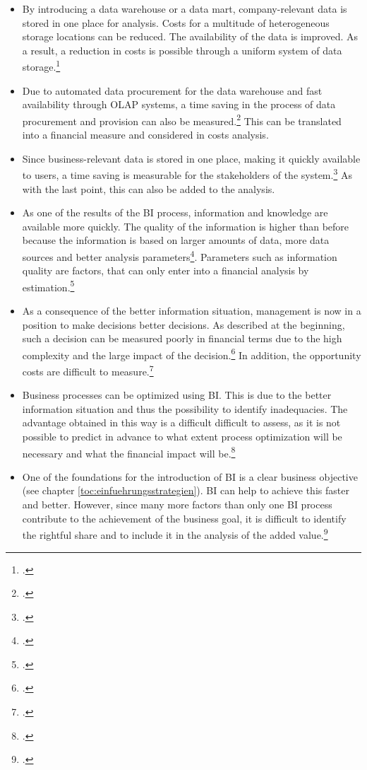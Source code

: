 \begin{itemize}
    \item By introducing a data warehouse or a data mart, company-relevant data is stored in one place for analysis.
    Costs for a multitude of heterogeneous storage locations can be reduced. The availability
    of the data is improved. As a result, a reduction in costs is possible through a uniform system of data storage.\footcite[Cf.][p. 105]{azma2012business}
    \item Due to automated data procurement for the data warehouse and fast availability through \ac{OLAP} systems,
    a time saving in the process of data procurement and provision can also be measured.\footcite[Cf.][p. 51]{horakova2013business}
    This can be translated into a financial measure and considered in costs analysis.
    \item Since business-relevant data is stored in one place, making it quickly available to users,
    a time saving is measurable for the stakeholders of the system.\footcite[Cf.][p. 97]{williams2003business} As with the
    last point, this can also be added to the analysis.
    \item As one of the results of the BI process, information and knowledge are available more quickly. The quality of the
    information is higher than before because the information is based on larger amounts of data, more data sources and better analysis
    parameters\footcite[Cf.][p. 51]{horakova2013business}. Parameters such as information quality are factors,
    that can only enter into a financial analysis by estimation.\footcite[Cf.][p. 51]{horakova2013business}
    \item As a consequence of the better information situation, management is now in a position to make decisions better
    decisions. As described at the beginning, such a decision can be measured poorly in financial terms due to the high complexity and the large impact of the decision.\footcite[Cf.][p. 51]{horakova2013business}
    In addition, the opportunity costs are difficult to measure.\footcite[Cf.][p. 99]{hovcevar2010assessing}
    \item Business processes can be optimized using \ac{BI}. This is due to the better information situation and
    thus the possibility to identify inadequacies. The advantage obtained in this way is a difficult
    difficult to assess, as it is not possible to predict in advance to what extent process optimization will be necessary and what the financial impact will be.\footcite[Cf.][p. 2]{williams2003business}
    \item One of the foundations for the introduction of \ac{BI} is a clear business objective (see chapter \ref{toc:einfuehrungsstrategien}).
    \ac{BI} can help to achieve this faster and better. However, since many more factors than only one BI process
    contribute to the achievement of the business goal, it is difficult to identify the rightful share and to include it in the
    analysis of the added value.\footcite[Cf.][p. 51]{horakova2013business}
\end{itemize}


